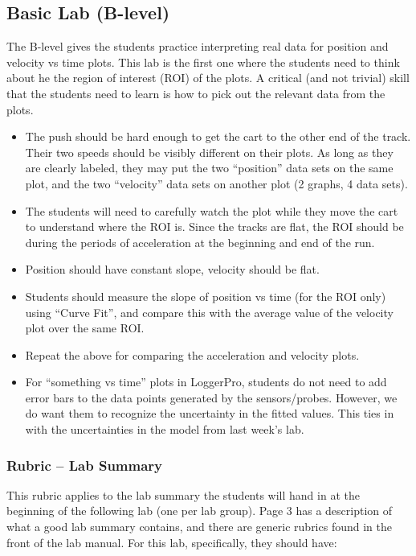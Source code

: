 \documentclass[fleqn,letterpaper]{article}
\begin{document}
\subsection*{Basic Lab (B-level)}

The B-level gives the students practice interpreting real data for position and velocity vs time plots.  This lab is the first one where the students need to think about he the region of interest (ROI) of the plots.  A critical (and not trivial) skill that the students need to learn is how to pick out the relevant data from the plots.

\begin{itemize}
\item{The push should be hard enough to get the cart to the other end of the track.  Their two speeds should be visibly different on their plots.  As long as they are clearly labeled, they may put the two ``position'' data sets on the same plot, and the two ``velocity'' data sets on another plot (2 graphs, 4 data sets).}
\item{The students will need to carefully watch the plot while they move the cart to understand where the ROI is.  Since the tracks are flat, the ROI should be during the periods of acceleration at the beginning and end of the run.}
\item{Position should have constant slope, velocity should be flat.}
\item{Students should measure the slope of position vs time (for the ROI only) using ``Curve Fit'', and compare this with the average value of the velocity plot over the same ROI.}
\item{Repeat the above for comparing the acceleration and velocity plots.}
\item{For ``something vs time'' plots in LoggerPro, students do not need to add error bars to the data points generated by the sensors/probes.  However, we do want them to recognize the uncertainty in the fitted values.  This ties in with the uncertainties in the model from last week's lab.}
\end{itemize}

\subsubsection*{Rubric -- Lab Summary}

This rubric applies to the lab summary the students will hand in at the beginning of the following lab (one per lab group).  Page 3 has a description of what a good lab summary contains, and there are generic rubrics found in the front of the lab manual.  For this lab, specifically, they should have:
\end{document}
